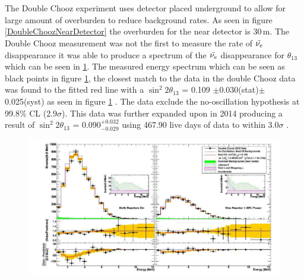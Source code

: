 \\\\The Double Chooz experiment uses detector placed underground to allow for large amount of overburden to reduce background rates. As seen in figure \ref{DoubleChoozNearDetector} the overburden for the near detector is 30\,m\cite{lasserre2006}. The Double Chooz measurement  was not the first to measure the rate of $\Bar{\nu_e}$ disappearance \cite{reno_may_2012} it was able to produce a spectrum of the $\Bar{\nu_e}$ disappearance for $\theta_{13}$ which can be seen in \ref{doubleChoozSpectrumNoCaption}. The measured energy spectrum which can be seen as black points in figure \ref{doubleChoozSpectrumNoCaption}, the closest match to the data in the double Chooz data was found to the fitted red line with a $\sin^2{2\theta_{13}}$ = 0.109 $\pm$0.030(stat)$\pm$0.025(syst) as seen in figure \ref{doubleChoozSpectrumNoCaption} \cite{Abe_2012}. The data exclude the no-oscillation hypothesis at 99.8$\%$ CL (2.9$\sigma$)\cite{Abe_2012}. This data was further expanded upon in 2014 producing a result of $\sin^2{2\theta_{13}}$ = 0.090$^{+0.032}_{-0.029}$ using 467.90 live days of data to within $3.0\sigma$ \cite{abe2014improved}.
\begin{figure}[htbp]
 \centering
 \includegraphics[width=\linewidth]{Chapter2/Figs/Raster/doubleChoozSpectrumNoCaption.png} %
 \label{doubleChoozSpectrumNoCaption}
\end{figure}

